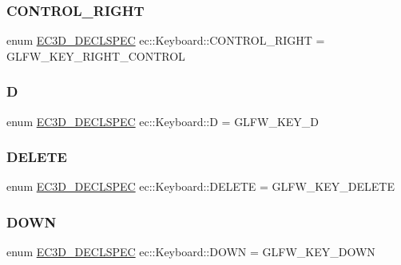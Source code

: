 \subsubsection{\texorpdfstring{C\+O\+N\+T\+R\+O\+L\+\_\+\+R\+I\+G\+HT}{CONTROL\_RIGHT}}
{\footnotesize\ttfamily enum \mbox{\hyperlink{_common_8h_aac42573e202ca3dd4d259c81691e2369}{E\+C3\+D\+\_\+\+D\+E\+C\+L\+S\+P\+EC}} ec\+::\+Keyboard\+::\+C\+O\+N\+T\+R\+O\+L\+\_\+\+R\+I\+G\+HT = G\+L\+F\+W\+\_\+\+K\+E\+Y\+\_\+\+R\+I\+G\+H\+T\+\_\+\+C\+O\+N\+T\+R\+OL}

\mbox{\label{classec_1_1_keyboard_ab15bf9e1970fea6d05ec91687089dff1}} 
\subsubsection{\texorpdfstring{D}{D}}
{\footnotesize\ttfamily enum \mbox{\hyperlink{_common_8h_aac42573e202ca3dd4d259c81691e2369}{E\+C3\+D\+\_\+\+D\+E\+C\+L\+S\+P\+EC}} ec\+::\+Keyboard\+::D = G\+L\+F\+W\+\_\+\+K\+E\+Y\+\_\+D}

\mbox{\label{classec_1_1_keyboard_a634762447b8ddd50dc8c002f9db5b9ae}} 
\subsubsection{\texorpdfstring{D\+E\+L\+E\+TE}{DELETE}}
{\footnotesize\ttfamily enum \mbox{\hyperlink{_common_8h_aac42573e202ca3dd4d259c81691e2369}{E\+C3\+D\+\_\+\+D\+E\+C\+L\+S\+P\+EC}} ec\+::\+Keyboard\+::\+D\+E\+L\+E\+TE = G\+L\+F\+W\+\_\+\+K\+E\+Y\+\_\+\+D\+E\+L\+E\+TE}

\mbox{\label{classec_1_1_keyboard_a9ce6be84370e9da9eab27348d9f98b5a}} 
\subsubsection{\texorpdfstring{D\+O\+WN}{DOWN}}
{\footnotesize\ttfamily enum \mbox{\hyperlink{_common_8h_aac42573e202ca3dd4d259c81691e2369}{E\+C3\+D\+\_\+\+D\+E\+C\+L\+S\+P\+EC}} ec\+::\+Keyboard\+::\+D\+O\+WN = G\+L\+F\+W\+\_\+\+K\+E\+Y\+\_\+\+D\+O\+WN}


